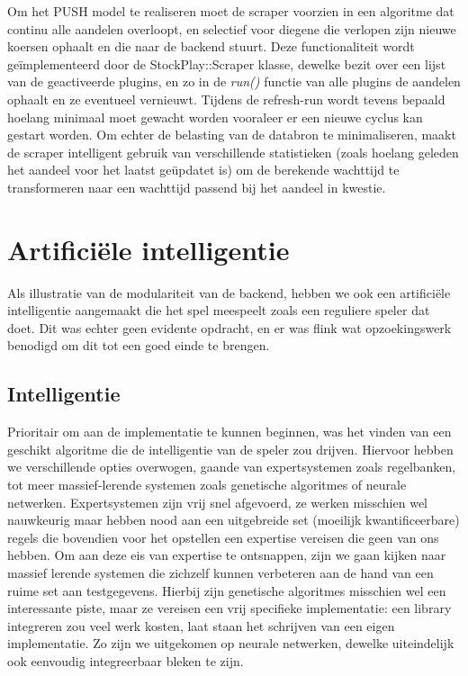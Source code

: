 Om het PUSH model te realiseren moet de scraper voorzien in een algoritme dat continu alle aandelen overloopt, en selectief voor diegene die verlopen zijn nieuwe koersen ophaalt en die naar de backend stuurt. Deze functionaliteit wordt ge\"implementeerd door de StockPlay::Scraper klasse, dewelke bezit over een lijst van de geactiveerde plugins, en zo in de \emph{run()} functie van alle plugins de aandelen ophaalt en ze eventueel vernieuwt. Tijdens de refresh-run wordt tevens bepaald hoelang minimaal moet gewacht worden vooraleer er een nieuwe cyclus kan gestart worden. Om echter de belasting van de databron te minimaliseren, maakt de scraper intelligent gebruik van verschillende statistieken (zoals hoelang geleden het aandeel voor het laatst ge\"updatet is) om de berekende wachttijd te transformeren naar een wachttijd passend bij het aandeel in kwestie.


%
%

\chapter{Artifici\"ele intelligentie}

Als illustratie van de modulariteit van de backend, hebben we ook een artifici\"ele intelligentie aangemaakt die het spel meespeelt zoals een reguliere speler dat doet. Dit was echter geen evidente opdracht, en er was flink wat opzoekingswerk benodigd om dit tot een goed einde te brengen.


\section{Intelligentie}

Prioritair om aan de implementatie te kunnen beginnen, was het vinden van een geschikt algoritme die de intelligentie van de speler zou drijven. Hiervoor hebben we verschillende opties overwogen, gaande van expertsystemen zoals regelbanken, tot meer massief-lerende systemen zoals genetische algoritmes of neurale netwerken. Expertsystemen zijn vrij snel afgevoerd, ze werken misschien wel nauwkeurig maar hebben nood aan een uitgebreide set (moeilijk kwantificeerbare) regels die bovendien voor het opstellen een expertise vereisen die geen van ons hebben. Om aan deze eis van expertise te ontsnappen, zijn we gaan kijken naar massief lerende systemen die zichzelf kunnen verbeteren aan de hand van een ruime set aan testgegevens. Hierbij zijn genetische algoritmes misschien wel een interessante piste, maar ze vereisen een vrij specifieke implementatie: een library integreren zou veel werk kosten, laat staan het schrijven van een eigen implementatie. Zo zijn we uitgekomen op neurale netwerken, dewelke uiteindelijk ook eenvoudig integreerbaar bleken te zijn.

